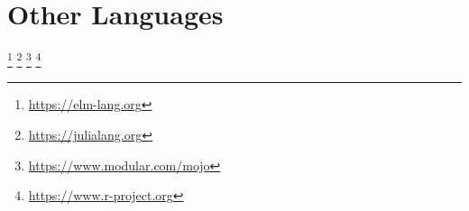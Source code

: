 \section{Other Languages}

\begin{itemize}
  \footnote{\url{https://elm-lang.org}}
  \footnote{\url{https://julialang.org}}
  \footnote{\url{https://www.modular.com/mojo}}
  \footnote{\url{https://www.r-project.org}}
\end{itemize}
